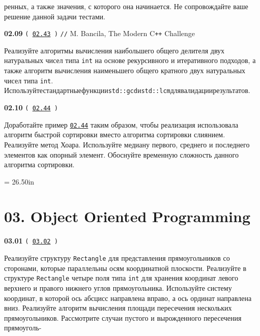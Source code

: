 \documentclass[a4paper,12pt]{article}
\begin{document}
ренных, а также значения, с которого она начинается. Не сопровождайте ваше решение данной задачи тестами.

\bigskip

{\large \textbf{02.09} \texttt{(\,\href{https://github.com/i-s-m-mipt/Education/blob/master/projects/examples/source/02.43.cpp}{02.43}\,)} \texttt{//} M. Bancila, The Modern C\texttt{++} Challenge}

\bigskip

Реализуйте алгоритмы вычисления наибольшего общего делителя двух натуральных чисел типа \lstinline{int} на основе рекурсивного и итеративного подходов, а также алгоритм вычисления наименьшего общего кратного двух натуральных чисел типа \lstinline{int}. Используйте\:стандартные\:функции\:\lstinline{std::gcd}\:и\:\lstinline{std::lcm}\:для\:валидации\:результатов.

\bigskip

{\large \textbf{02.10} \texttt{(\,\href{https://github.com/i-s-m-mipt/Education/blob/master/projects/examples/source/02.44.cpp}{02.44}\,)}}

\bigskip

Доработайте пример \href{https://github.com/i-s-m-mipt/Education/blob/master/projects/examples/source/02.44.cpp}{\texttt{02.44}} таким образом, чтобы реализация использовала алгоритм быстрой сортировки вместо алгоритма сортировки слиянием. Реализуйте метод Хоара. Используйте медиану первого, среднего и последнего элементов как опорный элемент. Обоснуйте временную сложность данного алгоритма сортировки.



\newpage\thispagestyle{empty}\pdfpageheight = 26.50in\enlargethispage{100in}

\section{03. Object Oriented Programming}

{\large \textbf{03.01} \texttt{(\,\href{https://github.com/i-s-m-mipt/Education/blob/master/projects/examples/source/03.02.cpp}{03.02}\,)}}

\bigskip

Реализуйте структуру \lstinline{Rectangle} для представления прямоугольников со сторонами, которые параллельны осям координатной плоскости. Реализуйте в структуре \lstinline{Rectangle} четыре поля типа \lstinline{int} для хранения координат левого верхнего и правого нижнего углов прямоугольника. Используйте систему координат, в которой ось абсцисс направлена вправо, а ось ординат направлена вниз. Реализуйте алгоритм вычисления площади пересечения нескольких прямоугольников. Рассмотрите случаи пустого и вырожденного пересечения прямоуголь- 
\end{document}
